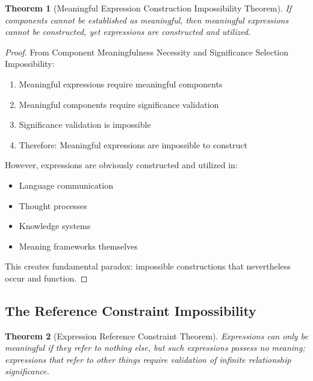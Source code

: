 \documentclass[12pt,a4paper]{article}
\newtheorem{theorem}{Theorem}[section]
\begin{document}
\begin{theorem}[Meaningful Expression Construction Impossibility Theorem]
If components cannot be established as meaningful, then meaningful expressions cannot be constructed, yet expressions are constructed and utilized.
\end{theorem}

\begin{proof}
From Component Meaningfulness Necessity and Significance Selection Impossibility:
\begin{enumerate}
\item Meaningful expressions require meaningful components
\item Meaningful components require significance validation  
\item Significance validation is impossible
\item Therefore: Meaningful expressions are impossible to construct
\end{enumerate}

However, expressions are obviously constructed and utilized in:
\begin{itemize}
\item Language communication
\item Thought processes  
\item Knowledge systems
\item Meaning frameworks themselves
\end{itemize}

This creates fundamental paradox: impossible constructions that nevertheless occur and function.
\end{proof}

\subsection{The Reference Constraint Impossibility}

\begin{theorem}[Expression Reference Constraint Theorem]
Expressions can only be meaningful if they refer to nothing else, but such expressions possess no meaning; expressions that refer to other things require validation of infinite relationship significance.
\end{theorem}
\end{document}

